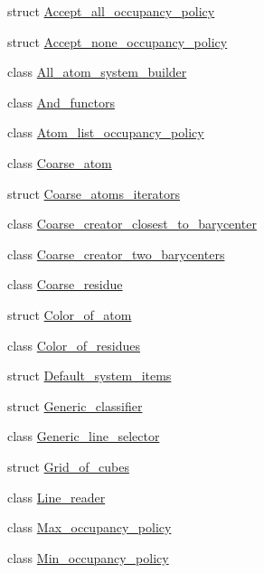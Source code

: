 \begin{DoxyCompactItemize}
\item 
struct \hyperlink{structESBTL_1_1Accept__all__occupancy__policy}{Accept\+\_\+all\+\_\+occupancy\+\_\+policy}
\item 
struct \hyperlink{structESBTL_1_1Accept__none__occupancy__policy}{Accept\+\_\+none\+\_\+occupancy\+\_\+policy}
\item 
class \hyperlink{classESBTL_1_1All__atom__system__builder}{All\+\_\+atom\+\_\+system\+\_\+builder}
\item 
class \hyperlink{classESBTL_1_1And__functors}{And\+\_\+functors}
\item 
class \hyperlink{classESBTL_1_1Atom__list__occupancy__policy}{Atom\+\_\+list\+\_\+occupancy\+\_\+policy}
\item 
class \hyperlink{classESBTL_1_1Coarse__atom}{Coarse\+\_\+atom}
\item 
struct \hyperlink{structESBTL_1_1Coarse__atoms__iterators}{Coarse\+\_\+atoms\+\_\+iterators}
\item 
class \hyperlink{classESBTL_1_1Coarse__creator__closest__to__barycenter}{Coarse\+\_\+creator\+\_\+closest\+\_\+to\+\_\+barycenter}
\item 
class \hyperlink{classESBTL_1_1Coarse__creator__two__barycenters}{Coarse\+\_\+creator\+\_\+two\+\_\+barycenters}
\item 
class \hyperlink{classESBTL_1_1Coarse__residue}{Coarse\+\_\+residue}
\item 
struct \hyperlink{structESBTL_1_1Color__of__atom}{Color\+\_\+of\+\_\+atom}
\item 
class \hyperlink{classESBTL_1_1Color__of__residues}{Color\+\_\+of\+\_\+residues}
\item 
struct \hyperlink{structESBTL_1_1Default__system__items}{Default\+\_\+system\+\_\+items}
\item 
struct \hyperlink{structESBTL_1_1Generic__classifier}{Generic\+\_\+classifier}
\item 
class \hyperlink{classESBTL_1_1Generic__line__selector}{Generic\+\_\+line\+\_\+selector}
\item 
struct \hyperlink{structESBTL_1_1Grid__of__cubes}{Grid\+\_\+of\+\_\+cubes}
\item 
class \hyperlink{classESBTL_1_1Line__reader}{Line\+\_\+reader}
\item 
class \hyperlink{classESBTL_1_1Max__occupancy__policy}{Max\+\_\+occupancy\+\_\+policy}
\item 
class \hyperlink{classESBTL_1_1Min__occupancy__policy}{Min\+\_\+occupancy\+\_\+policy}

\end{DoxyCompactItemize}
